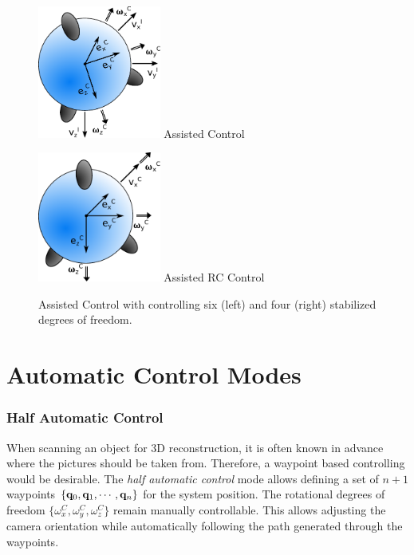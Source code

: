 \begin{figure}[H]		
	\small{
		\begin{center}
			\parbox{0.36\textwidth}{\centering \includegraphics[width=0.36\textwidth]{AC}
			 Assisted Control}
			\hspace{0.1\textwidth}			
			\parbox{0.36\textwidth}{\centering \includegraphics[width=0.36\textwidth]{RC}
			Assisted RC Control}
	\caption[Assisted Control]{Assisted Control with controlling six (left) and four (right) stabilized degrees of freedom.}
		\label{fig:assisted_control}
		\end{center}
	}			
	\vspace{4.5mm}
\end{figure}

\section{Automatic Control Modes}
\label{sec:automaticControlModes}

\subsubsection{Half Automatic Control}
When scanning an object for 3D reconstruction, it is often known in advance where the pictures should be taken from. Therefore, a waypoint based controlling would be desirable. The \textit{half automatic control} mode allows defining a set of $n+1$ waypoints $\{{\bf q}_0, {\bf q}_1, \cdots, {\bf q}_n\}$ for the system position. The rotational degrees of freedom $\{\omega_x^C, \omega_y^C, \omega_z^C\}$ remain manually controllable. This allows adjusting the camera orientation while automatically following the path generated through the waypoints.%

